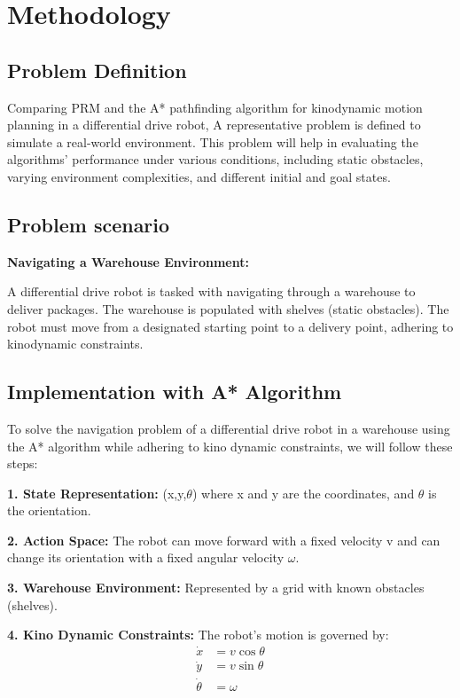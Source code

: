 \documentclass[9pt,a4paper,twoside]{rho-class/rho}
\begin{document}
    \section{Methodology}
    \subsection{Problem Definition}
    Comparing PRM and the A* pathfinding algorithm for kinodynamic motion planning in a differential drive robot, A representative problem is defined to simulate a real-world environment. This problem will help in evaluating the algorithms' performance under various conditions, including static obstacles, varying environment complexities, and different initial and goal states.

    \subsection{Problem scenario}
    \textbf{Navigating a Warehouse Environment:}
    
    A differential drive robot is tasked with navigating through a warehouse to deliver packages. The warehouse is populated with shelves (static obstacles). The robot must move from a designated starting point to a delivery point, adhering to kinodynamic constraints.

    \subsection{Implementation with A* Algorithm}
    To solve the navigation problem of a differential drive robot in a warehouse using the A* algorithm while adhering to kino dynamic constraints, we will follow these steps:
    
    
    \textbf{1. State Representation:} (x,y,$\theta$) where x and y are the coordinates, and $\theta$ is the orientation.
    
    \textbf{2. Action Space:} The robot can move forward with a fixed velocity v and can change its orientation with a fixed angular velocity $\omega$.
    
    \textbf{3. Warehouse Environment:} Represented by a grid with known obstacles (shelves).
    
    \textbf{4. Kino Dynamic Constraints:} The robot's motion is governed by:
    \begin{align*}
         \Dot{x}& = v\cos{\theta}\\
         \Dot{y}& = v\sin{\theta}\\
         \Dot{\theta}& = \omega
     \end{align*}
\end{document}
